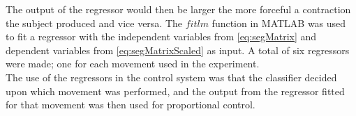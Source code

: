 The output of the regressor would then be larger the more forceful a contraction the subject produced and vice versa. The $fitlm$ function in MATLAB was used to fit a regressor with the independent variables from \eqref{eq:segMatrix} and dependent variables from \eqref{eq:segMatrixScaled} as input. A total of six regressors were made; one for each movement used in the experiment. \\
The use of the regressors in the control system was that the classifier decided upon which movement was performed, and the output from the regressor fitted for that movement was then used for proportional control. 


